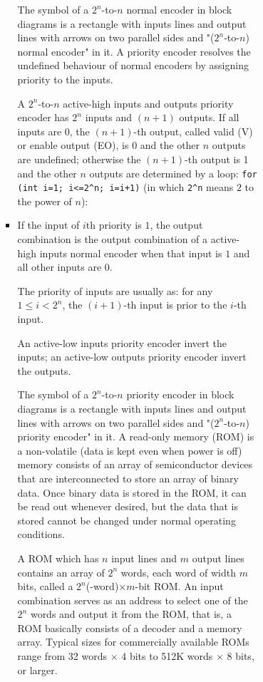 \documentclass[a4paper,12pt]{article}
\begin{document}
\begin{itemize}
\begin{itemize}
\begin{itemize}
\begin{itemize}
\begin{itemize}
\begin{itemize}
\begin{itemize}
The symbol of a $2^n$-to-$n$ normal encoder in block diagrams is a rectangle with inputs lines and output lines with arrows on two parallel sides and "($2^n$-to-$n$) normal encoder" in it.
A priority encoder resolves the undefined behaviour of normal encoders by assigning priority to the inputs.

A $2^n$-to-$n$ active-high inputs and outputs priority encoder has $2^n$ inputs and $(n+1)$ outputs. If all inputs are 0, the $(n+1)$-th output, called valid (V) or enable output (EO), is 0 and the other $n$ outputs are undefined; otherwise the $(n+1)$-th output is 1 and the other $n$ outputs are determined by a loop: \texttt{for (int i=1; i<=2^n; i=i+1)} (in which \verb|2^n| means $2$ to the power of $n$):
\bit
\item If the input of $i$th priority is $1$, the output combination is the output combination of a active-high inputs normal encoder when that input is $1$ and all other inputs are $0$.
\eit

The priority of inputs are usually as: for any $1\leq i<2^n$, the $(i+1)$-th input is prior to the $i$-th input.

An active-low inputs priority encoder invert the inputs; an active-low outputs priority encoder invert the outputs.

The symbol of a $2^n$-to-$n$ priority encoder in block diagrams is a rectangle with inputs lines and output lines with arrows on two parallel sides and "($2^n$-to-$n$) priority encoder" in it.
A read-only memory (ROM) is a non-volatile (data is kept even when power is off) memory consists of an array of semiconductor devices that are interconnected to store an array of binary data. Once binary data is stored in the ROM, it can be read out whenever desired, but the data that is stored cannot be changed under normal operating conditions.

A ROM which has $n$ input lines and $m$ output lines contains an array of $2^n$ words, each word of width $m$ bits, called a $2^n$(-word)$\times m$-bit ROM. An input combination serves as an address to select one of the $2^n$ words and output it from the ROM, that is, a ROM basically consists of a decoder and a memory array. Typical sizes for commercially available ROMs range from 32 words $\times$ 4 bits to 512K words $\times$ 8 bits, or larger.


\end{itemize}
\end{itemize}
\end{itemize}
\end{itemize}
\end{itemize}
\end{itemize}
\end{itemize}
\end{document}
